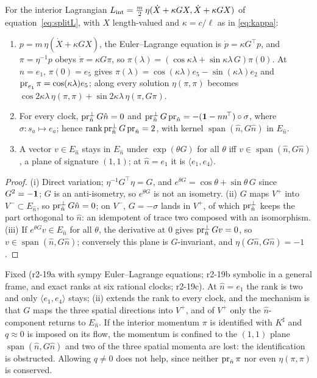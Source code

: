 \begin{proposition}
\label{r2:prop:leak}
For the interior Lagrangian $L_{\rm int}=\tfrac m2\,\eta(\dot X+\kappa GX,\dot X+\kappa GX)$ of equation~\cref{eq:splitL}, with $X$ length-valued and $\kappa=c/\ell$
as in \eqref{eq:kappa}:
\begin{enumerate}[label=(\roman*),leftmargin=2.2em]
\item $p=m\,\eta(\dot X+\kappa GX)$, the Euler--Lagrange equation is $\dot p=\kappa G^{\!\top}p$, and $\pi=\eta^{-1}p$ obeys $\dot\pi=\kappa G\pi$, so
$\pi(\lambda)=(\cos\kappa\lambda+\sin\kappa\lambda\,G)\pi(0)$. At $\hat n=e_1$, $\pi(0)=e_5$ gives $\pi(\lambda)=\cos(\kappa\lambda)e_5-\sin(\kappa\lambda)e_2$ and
$\operatorname{pr}_{e_1}\pi=\cos(\kappa\lambda)e_5$; along every solution $\eta(\pi,\pi)$ becomes $\cos2\kappa\lambda\,\eta(\pi,\pi)+\sin2\kappa\lambda\,\eta(\pi,G\pi)$.
\item For every clock, $\operatorname{pr}^{\perp}_{\hat n}G\hat n=0$ and $\operatorname{pr}^{\perp}_{\hat n}G\operatorname{pr}_{\hat n}=-(\mathbf 1-nn^{\!\top})\circ\sigma$, where $\sigma:s_a\mapsto e_a$; hence
$\operatorname{rank}\operatorname{pr}^{\perp}_{\hat n}G\operatorname{pr}_{\hat n}=2$, with kernel $\operatorname{span}(\hat n,G\hat n)$ in $E_{\hat n}$.
\item A vector $v\in E_{\hat n}$ stays in $E_{\hat n}$ under $\exp(\theta G)$ for all $\theta$ iff $v\in\operatorname{span}(\hat n,G\hat n)$, a plane of signature $(1,1)$; at $\hat n=e_1$
it is $\langle e_1,e_4\rangle$.
\end{enumerate}
\end{proposition}

\begin{proof}
(i) Direct variation; $\eta^{-1}G^{\!\top}\eta=G$, and $e^{\theta G}=\cos\theta+\sin\theta\,G$ since $G^2=-\mathbf 1$; $G$ is an anti-isometry, so $e^{\theta G}$ is not an
isometry. (ii) $G$ maps $V^+$ into $V^-\subset E_{\hat n}$, so $\operatorname{pr}^{\perp}_{\hat n}G\hat n=0$; on $V^-$, $G=-\sigma$ lands in $V^+$, of which $\operatorname{pr}^{\perp}_{\hat n}$ keeps the part orthogonal to
$\hat n$: an idempotent of trace two composed with an isomorphism. (iii) If $e^{\theta G}v\in E_{\hat n}$ for all $\theta$, the derivative at $0$ gives $\operatorname{pr}^{\perp}_{\hat n}Gv=0$, so
$v\in\operatorname{span}(\hat n,G\hat n)$; conversely this plane is $G$-invariant, and $\eta(G\hat n,G\hat n)=-1$.
\end{proof}

Fixed (r2-19a with sympy Euler--Lagrange equations; r2-19b symbolic in a general frame, and exact ranks at six rational clocks; r2-19c). At $\hat n=e_1$ the rank is two and only $\langle e_1,e_4\rangle$ stays; (ii) extends the rank to every clock, and the
mechanism is that $G$ maps the three spatial directions into $V^+$, and of $V^+$ only the $\hat n$-component returns to $E_{\hat n}$. If the interior
momentum $\pi$ is identified with $K^\sharp$ and $q\approx0$ is imposed on its flow, the momentum is confined to the $(1,1)$ plane $\operatorname{span}(\hat n,G\hat n)$ and
two of the three spatial momenta are lost: the identification is obstructed. Allowing $q\neq0$ does not help, since neither $\operatorname{pr}_{\hat n}\pi$ nor even
$\eta(\pi,\pi)$ is conserved.

